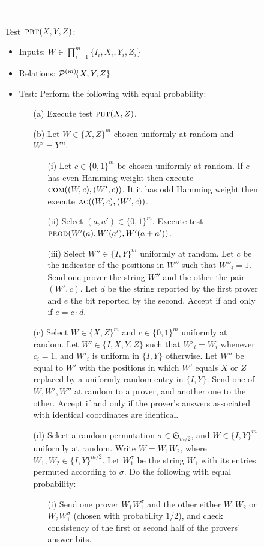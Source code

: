 \begin{figure}[H]
\rule[1ex]{\textwidth}{0.5pt}\\
\justifying
Test~$\textsc{pbt}(X,Y,Z)$: 
\begin{itemize}
\item Inputs: $W\in\prod_{i=1}^m\{I_i,X_i,Y_i,Z_i\}$
\item Relations: $\mathcal{P}^{(m)}\!\{X,Y,Z\}$.  
\item Test: Perform the following with equal probability: 
\begin{enumerate}
\item[(a)] Execute test $\textsc{pbt}(X,Z)$. 
\item[(b)] Let $W\in\{X,Z\}^m$ chosen uniformly at random and $W'=Y^m$. 
\begin{enumerate}
\item[(i)] Let $c\in\{0,1\}^m$ be chosen uniformly at random. If $c$ has even Hamming weight then execute $\textsc{com}((W,c),(W',c))$. It it has odd Hamming weight then execute $\textsc{ac}((W,c),(W',c))$. 
\item[(ii)]  Select $(a,a')\in\{0,1\}^m$. Execute test $\textsc{prod}(W'(a),W'(a'),W'(a+a'))$. 
\item[(iii)] Select $W''\in\{I,Y\}^m$ uniformly at random. Let $c$ be the indicator of the positions in $W''$ such that $W''_i=1$. Send one prover the string $W''$ and the other the pair $(W',c)$. Let $d$ be the string reported by the first prover and $e$ the bit reported by the second. Accept if and only if $e=c\cdot d$. 
\end{enumerate}
\item[(c)] Select $W\in\{X,Z\}^m$ and $c\in\{0,1\}^m$ uniformly at random. Let $W'\in\{I,X,Y,Z\}$ such that $W'_i=W_i$ whenever $c_i=1$, and $W'_i$ is uniform in $\{I,Y\}$ otherwise. Let $W''$ be equal to $W'$ with the positions in which $W'$ equals $X$ or $Z$ replaced by a uniformly random entry in $\{I,Y\}$. Send one of $W,W',W''$ at random to a prover, and another one to the other. Accept if and only if the prover's answers associated with identical coordinates are identical. 
\item[(d)] Select a random permutation  $\sigma \in \mathfrak{S}_{m/2}$, and $W\in  \{I,Y\}^m$ uniformly at random. Write $W=W_1 W_2$, where $W_1,W_2\in \{I,Y\}^{m/2}$. Let $W_1^\sigma$ be the string $W_1$ with its entries permuted according to $\sigma$. Do the following with equal probability: 
\begin{enumerate}
\item[(i)] Send one prover $W_1 W_1^\sigma$ and the other either $W_1 W_2$ or $W_2W_1^\sigma$ (chosen with probability $1/2$), and check consistency of the first or second half of the provers' answer bits.

\end{enumerate}
\end{enumerate}
\end{itemize}
\end{figure}
